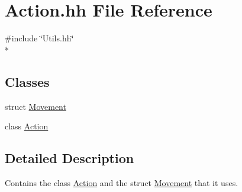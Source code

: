 \hypertarget{Action_8hh}{}\section{Action.\+hh File Reference}
\label{Action_8hh}
{\ttfamily \#include \char`\"{}Utils.\+hh\char`\"{}}\\*
\subsection*{Classes}
\begin{DoxyCompactItemize}
\item 
struct \hyperlink{structMovement}{Movement}
\item 
class \hyperlink{classAction}{Action}
\end{DoxyCompactItemize}


\subsection{Detailed Description}
Contains the class \hyperlink{classAction}{Action} and the struct \hyperlink{structMovement}{Movement} that it uses. 